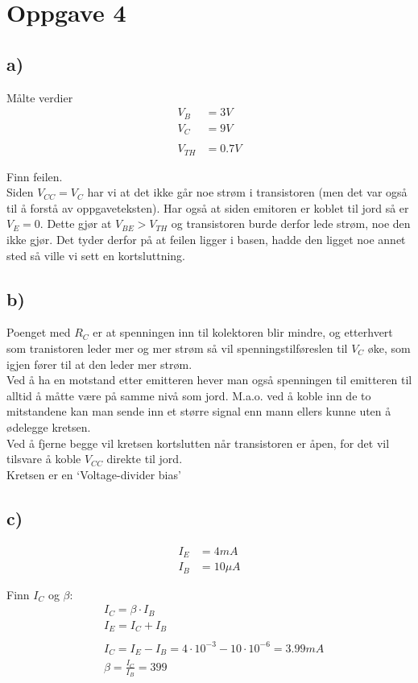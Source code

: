 \documentclass[a4paper, norsk, twoside, 10pt]{article}
\begin{document}
\section*{Oppgave 4}
\subsection*{a)}
Målte verdier
\begin{align*}
V_{B} &= 3V\\
V_{C} &= 9V\\
\\
V_{TH} &= 0.7V
\end{align*}

Finn feilen.\\
Siden $V_{CC} = V_{C}$ har vi at det ikke går noe strøm i transistoren (men det var også til å forstå av oppgaveteksten). Har også at siden emitoren er koblet til jord så er $V_{E} =0$. Dette gjør at $V_{BE} > V_{TH}$ og transistoren burde derfor lede strøm, noe den ikke gjør. Det tyder derfor på at feilen ligger i basen, hadde den ligget noe annet sted så ville vi sett en kortsluttning.


\subsection*{b)}
Poenget med $R_{C}$ er at spenningen inn til kolektoren blir mindre, og etterhvert som tranistoren leder mer og mer strøm så vil spenningstilføreslen til $V_{C}$ øke, som igjen fører til at den leder mer strøm.
\\
Ved å ha en motstand etter emitteren hever man også spenningen til emitteren til alltid å måtte være på samme nivå som jord. M.a.o. ved å koble inn de to mitstandene kan man sende inn et større signal enn mann ellers kunne uten å ødelegge kretsen.
\\
Ved å fjerne begge vil kretsen kortslutten når transistoren er åpen, for det vil tilsvare å koble $V_{CC}$ direkte til jord.
\\
Kretsen er en `Voltage-divider bias'




\subsection*{c)}
\begin{align*}
  I_{E} &= 4mA\\
  I_{B} &= 10\mu A
\end{align*}

Finn $I_{C}$ og $\beta$:\\
\begin{align*}
  &I_{C} = \beta \cdot I_{B} \\
  &I_{E} = I_{C} + I_{B} \\
  \\
  &I_{C} = I_{E} - I_{B} = 4\cdot 10^{-3} - 10\cdot 10^{-6} = 3.99mA \\
  &\beta = \frac{I_{C}}{I_{B}} = 399
\end{align*}
\end{document}
